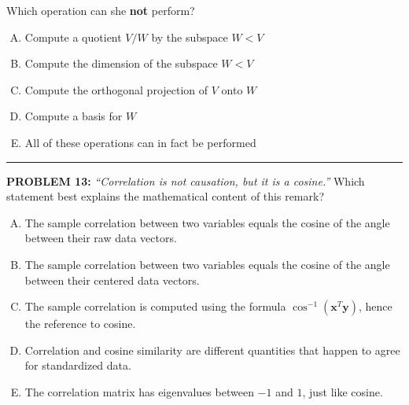 \documentclass[12pt]{amsart}
\newcommand{\divider}{
  \vspace{-1em} %
  \noindent
  \raisebox{-0.15ex}{\textbullet}%
  \hspace{0.5em}%
  \rule[0.5ex]{0.95\textwidth}{1.0pt}%
  \hspace{0.5em}%
  \raisebox{-0.15ex}{\textbullet}%
  \vspace{0em} %
}
\begin{document}
{Which operation can she \textbf{not} perform?

\begin{enumerate}[(A)]
\item Compute a quotient $V/W$ by the subspace $W<V$
\item Compute the dimension of the subspace $W<V$
\item Compute the orthogonal projection of $V$ onto $W$
\item Compute a basis for $W$
\item All of these operations can in fact be performed
\end{enumerate}


\divider

\newpage

{\bf PROBLEM 13:}
%
{\em ``Correlation is not causation, but it is a cosine.''}
%
Which statement best explains the mathematical content of this remark?

\begin{enumerate}[(A)]
\item The sample correlation between two variables equals the cosine of the angle between their raw data vectors.
\item The sample correlation between two variables equals the cosine of the angle between their centered data vectors.
\item The sample correlation is computed using the formula $\cos^{-1}(\mathbf{x}^T \mathbf{y})$, hence the reference to cosine.
\item Correlation and cosine similarity are different quantities that happen to agree for standardized data.
\item The correlation matrix has eigenvalues between $-1$ and $1$, just like cosine.
\end{enumerate}

}
\end{document}
